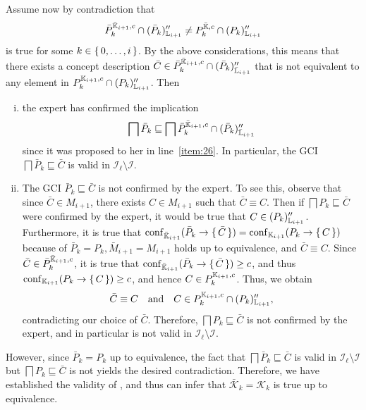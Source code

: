 \begin{Proof}
  Assume now by contradiction that
  \begin{equation*}
    \bar P_{k}^{\bar{{\mathbb{K}}}_{i+1}, c} \cap (\bar P_{k})_{{\mathbb{L}}_{i+1}}'' \neq
    P_{k}^{\bar{{\mathbb{K}}}, c} \cap (P_{k})_{{\mathbb{L}}_{i+1}}''
  \end{equation*}
  is true for some $k \in {\ensuremath{\{\, 0, \dots, i \,\}}}$.  By the above considerations, this means
  that there exists a concept description $\bar C \in \bar P_{k}^{\bar{{\mathbb{K}}}_{i+1}, c}
  \cap (\bar P_{k})_{\bar{{\mathbb{L}}}_{i+1}}''$ that is not equivalent to any element in
  $P_{k}^{{\mathbb{K}}_{i+1}, c} \cap (P_{k})_{{\mathbb{L}}_{i+1}}''$.  Then
  \begin{enumerate}[i. ]
  \item the expert has confirmed the implication
    \begin{equation*}
      \bigsqcap \bar P_{k} \sqsubseteq \bigsqcap \bar P_{k}^{\bar{{\mathbb{K}}}_{i+1}, c} \cap
      (\bar P_{k})_{\bar{{\mathbb{L}}}_{i+1}}''
    \end{equation*}
    since it was proposed to her in line~\ref{item:26}.  In particular, the GCI $\bigsqcap
    \bar P_{k} \sqsubseteq \bar C$ is valid in $\mathcal{I}_{\ell} \setminus \mathcal{I}$.
  \item The GCI $\bar P_{k} \sqsubseteq \bar C$ is not confirmed by the expert.  To see
    this, observe that since $\bar C \in M_{i+1}$, there exists $C \in M_{i+1}$ such that
    $\bar C \equiv C$.  Then if $\bigsqcap P_{k} \sqsubseteq \bar C$ were confirmed by the
    expert, it would be true that $C \in (P_{k})_{{\mathbb{L}}_{i+1}}''$.  Furthermore, it is
    true that $\operatorname{conf}_{\bar{{\mathbb{K}}}_{i+1}}(\bar P_{k} \to {\ensuremath{\{\, \bar C \,\}}}) = \operatorname{conf}_{{\mathbb{K}}_{i+1}}(P_{k} \to {\ensuremath{\{\, C \,\}}})$ because of $\bar P_{k} = P_{k}, \bar M_{i+1} =
    M_{i+1}$ holds up to equivalence, and $\bar C \equiv C$.  Since $\bar C \in \bar
    P_{k}^{\bar{{\mathbb{K}}}_{i+1}, c}$, it is true that $\operatorname{conf}_{\bar{{\mathbb{K}}}_{i+1}}(\bar P_{k}
    \to {\ensuremath{\{\, \bar C \,\}}}) \ge c$, and thus $\operatorname{conf}_{{\mathbb{K}}_{i+1}}(P_{k} \to {\ensuremath{\{\, C \,\}}}) \ge
    c$, and hence $C \in P_{k}^{{\mathbb{K}}_{i+1}, c}$.  Thus, we obtain
    \begin{equation*}
      \bar C \equiv C \quad\text{and}\quad C \in P_{k}^{{\mathbb{K}}_{i+1}, c} \cap
      (P_{k})_{{\mathbb{L}}_{i+1}}'',
    \end{equation*}
    contradicting our choice of $\bar C$.  Therefore, $\bigsqcap P_{k} \sqsubseteq \bar C$
    is not confirmed by the expert, and in particular is not valid in $\mathcal{I}_{\ell}
    \setminus \mathcal{I}$.
  \end{enumerate}
  However, since $\bar P_{k} = P_{k}$ up to equivalence, the fact that $\bigsqcap \bar
  P_{k} \sqsubseteq \bar C$ is valid in $\mathcal{I}_{\ell} \setminus \mathcal{I}$ but
  $\bigsqcap P_{k} \sqsubseteq \bar C$ is not yields the desired contradiction.
  Therefore, we have established the validity of , and thus can infer that
  $\bar{\mathcal{K}}_{k} = \mathcal{K}_{k}$ is true up to equivalence.


\end{Proof}
